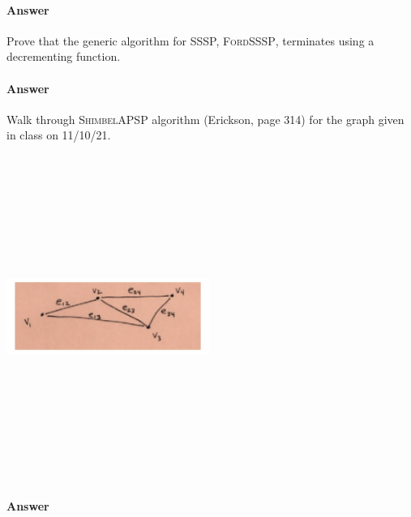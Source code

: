 \documentclass{article}
\begin{document}
\paragraph{Answer}


Prove that the generic algorithm for SSSP, \textsc{FordSSSP}, terminates using a
decrementing function.

\paragraph{Answer}


Walk through \textsc{ShimbelAPSP} algorithm (Erickson, page 314) for the graph given in class on
11/10/21.

\includegraphics[width=250,height=400,keepaspectratio]{432-111021-graph.png}

\paragraph{Answer}
\end{document}
